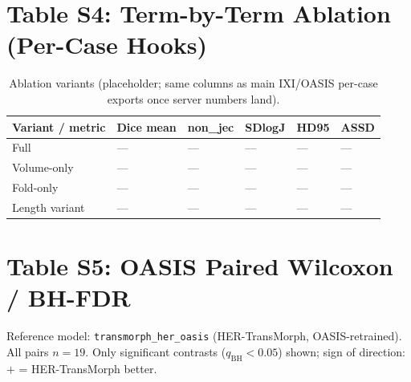\documentclass[11pt,a4paper]{article}
\begin{document}
\section{Table S4: Term-by-Term Ablation (Per-Case Hooks)}
\begin{table}[H]
\caption{Ablation variants (placeholder; same columns as main IXI/OASIS per-case exports once server numbers land).\label{tab:s4_ablation}}
\centering
\scriptsize
\begin{tabularx}{\textwidth}{lXXXXX}
\toprule
\textbf{Variant / metric} & \textbf{Dice mean} & \textbf{non\_jec} & \textbf{SDlogJ} & \textbf{HD95} & \textbf{ASSD} \\
\midrule
Full & --- & --- & --- & --- & --- \\
Volume-only & --- & --- & --- & --- & --- \\
Fold-only & --- & --- & --- & --- & --- \\
Length variant & --- & --- & --- & --- & --- \\
\bottomrule
\end{tabularx}
\end{table}

\section{Table S5: OASIS Paired Wilcoxon / BH-FDR}

\noindent Reference model: \texttt{transmorph\_her\_oasis} (HER-TransMorph, OASIS-retrained). All pairs $n{=}19$. Only significant contrasts ($q_{\mathrm{BH}}<0.05$) shown; sign of direction: $+$ = HER-TransMorph better.
\end{document}
